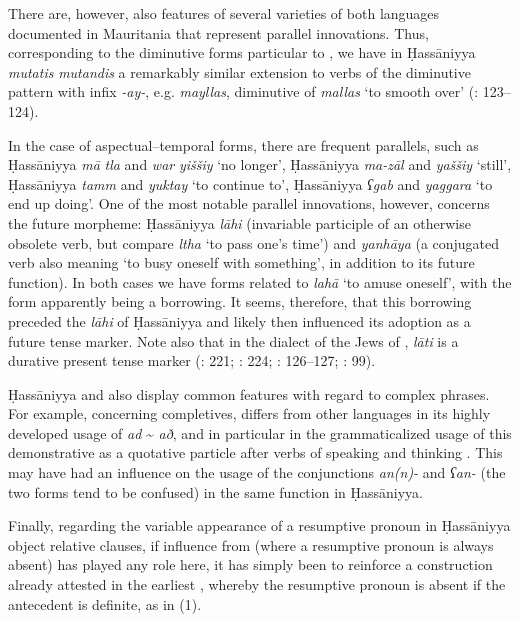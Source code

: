 \documentclass[output=paper]{langsci/langscibook}
\begin{document}
There are, however, also features of several varieties of both languages documented in Mauritania that represent parallel innovations. Thus, corresponding to the {diminutive} forms particular to , we have in Ḥassāniyya \textit{mutatis} \textit{mutandis} a remarkably similar {extension} to verbs of the {diminutive} pattern with infix \textit{-ay-}, e.g. \textit{mayllas}, {diminutive} of \textit{mallas} ‘to smooth over’ (\citealt{Taine-Cheikh2008chapter}: 123–124).

In the case of aspectual--temporal forms, there are frequent parallels, such as Ḥassāniyya \textit{mā} \textit{tla} and  \textit{war} \textit{yiššiy} ‘no longer’, Ḥassāniyya \textit{ma-zāl} and  \textit{yaššiy} ‘still’, Ḥassāniyya \textit{tamm} and  \textit{yuktay} ‘to continue to’, Ḥassāniyya \textit{ʕgab} and  \textit{yaggara} ‘to end up doing’. One of the most notable parallel innovations, however, concerns the {future} morpheme: Ḥassāniyya \textit{lāhi} (invariable {participle} of an otherwise obsolete verb, but compare \textit{ltha} ‘to pass one’s time’) and  \textit{yanhāya} (a conjugated verb also meaning ‘to busy oneself with something’, in addition to its {future} function). In both cases we have forms related to   \textit{lahā} ‘to amuse oneself’, with the  form apparently being a borrowing. It seems, therefore, that this borrowing preceded the \textit{lāhi} of Ḥassāniyya and likely then influenced its adoption as a {future} {tense} marker. Note also that in the  dialect of the {Jews} of , \textit{lāti} is a durative present {tense} marker (\citealt{Cohen1924}: 221; \citealt{Taine-Cheikh2004}: 224; \citealt{Taine-Cheikh2008chapter}: 126–127; \citealt{Taine-Cheikh2009}: 99).

Ḥassāniyya and  also display common features with regard to complex phrases. For example, concerning completives,  differs from other  languages in its highly developed usage of \textit{ad} \~{} \textit{að}, and in particular in the grammaticalized usage of this demonstrative as a quotative particle after verbs of speaking and thinking \citep{Taine-Cheikh2010Zenaga}. This may have had an influence on the usage of the conjunctions \textit{an(n)-} and \textit{ʕan-} (the two forms tend to be confused) in the same function in Ḥassāniyya.

Finally, regarding the variable appearance of a resumptive pronoun in Ḥassāniyya object {relative} clauses, if influence from  (where a resumptive pronoun is always absent) has played any role here, it has simply been to reinforce a construction already attested in the earliest , whereby the resumptive pronoun is absent if the antecedent is {definite}, as in ‎(1).
\end{document}
